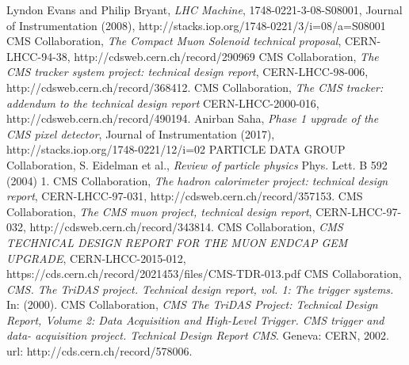 \begin{thebibliography}{999}
		 Lyndon Evans and Philip Bryant, \emph{LHC Machine}, 1748-0221-3-08-S08001, Journal of Instrumentation (2008), http://stacks.iop.org/1748-0221/3/i=08/a=S08001
		 CMS Collaboration, \emph{The Compact Muon Solenoid technical proposal}, CERN-LHCC-94-38, http://cdsweb.cern.ch/record/290969
		  CMS Collaboration, \emph{The CMS tracker system project: technical design report}, CERN-LHCC-98-006, http://cdsweb.cern.ch/record/368412.
		  CMS Collaboration, \emph{The CMS tracker: addendum to the technical design report} CERN-LHCC-2000-016, http://cdsweb.cern.ch/record/490194.
		 Anirban Saha, \emph{Phase 1 upgrade of the CMS pixel detector}, Journal of Instrumentation (2017), http://stacks.iop.org/1748-0221/12/i=02
		 PARTICLE DATA GROUP Collaboration, S. Eidelman et al., \emph{Review of particle physics} Phys. Lett. B 592 (2004) 1.
		  CMS Collaboration, \emph{The hadron calorimeter project: technical design report}, CERN-LHCC-97-031, http://cdsweb.cern.ch/record/357153.
		 CMS Collaboration, \emph{The CMS muon project, technical design report}, CERN-LHCC-97-032, http://cdsweb.cern.ch/record/343814.
		 CMS Collaboration, \emph{CMS TECHNICAL DESIGN REPORT FOR THE MUON ENDCAP GEM UPGRADE}, CERN-LHCC-2015-012, https://cds.cern.ch/record/2021453/files/CMS-TDR-013.pdf
		 CMS Collaboration, \emph{CMS. The TriDAS project. Technical design report, vol. 1: The trigger systems.} In: (2000).
		 CMS Collaboration, \emph{CMS The TriDAS Project: Technical Design Report, Volume 2: Data Acquisition and High-Level Trigger. CMS trigger and data- acquisition project. Technical Design Report CMS}. Geneva: CERN, 2002. url: http://cds.cern.ch/record/578006.
		

\end{thebibliography}
